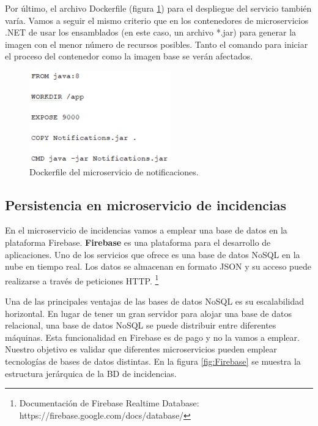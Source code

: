 \documentclass[11pt,spanish,listoffigures]{tfgetsinf}
\begin{document}
Por último, el archivo Dockerfile (figura \ref{fig:JavaDockerfile}) para el despliegue del servicio también varía. Vamos a seguir el mismo criterio que en los contenedores de microservicios .NET de usar los ensamblados (en este caso, un archivo *.jar) para generar la imagen con el menor número de recursos posibles. Tanto el comando para iniciar el proceso del contenedor como la imagen base se verán afectados.

\begin{figure}[h]
\centering
\includegraphics[scale=1]{JavaDockerfile}
\caption{Dockerfile del microservicio de notificaciones.}
\label{fig:JavaDockerfile}
\end{figure}

\newpage


\subsection{Persistencia en microservicio de incidencias}

En el microservicio de incidencias vamos a emplear una base de datos en la plataforma Firebase. \textbf{Firebase} es una plataforma para el desarrollo de aplicaciones. Uno de los servicios que ofrece es una base de datos NoSQL en la nube en tiempo real. Los datos se almacenan en formato JSON y su acceso puede realizarse a través de peticiones HTTP. \footnote{ Documentación de Firebase Realtime Database: https://firebase.google.com/docs/database/} 

Una de las principales ventajas de las bases de datos NoSQL es su escalabilidad horizontal. En lugar de tener un gran servidor para alojar una base de datos relacional, una base de datos NoSQL se puede distribuir entre diferentes máquinas. Esta funcionalidad en Firebase es de pago y no la vamos a emplear. Nuestro objetivo  es validar que diferentes microservicios pueden emplear tecnologías de bases de datos distintas. En la figura \ref{fig:Firebase} se muestra la estructura jerárquica de la BD de incidencias.
\end{document}

